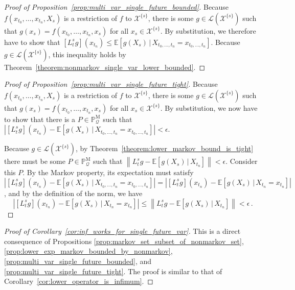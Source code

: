 \documentclass[10pt]{paper}
\theoremstyle{definition}
\newcommand{\states}{\mathcal{X}}
\newcommand{\processes}{\mathbb{P}}
\newcommand{\mprocesses}{\processes^{\mathrm{M}}}
\newcommand{\gambles}{\mathcal{L}}
\newcommand{\rateset}{\mathcal{Q}}
\newcommand{\norm}[1]{\left\lVert #1 \right\rVert}
\newcommand{\abs}[1]{\left\vert #1 \right\vert}
\begin{document}
\begin{proof}[Proof of Proposition~\ref{prop:multi_var_single_future_bounded}]
Because $f(x_{t_0},\ldots,x_{t_n},X_s)$ is a restriction of $f$ to $\states^{\{s\}}$, there is some $g\in\gambles(\states^{\{s\}})$ such that $g(x_s) = f(x_{t_0},\ldots,x_{t_n},x_s)$ for all $x_s\in\states^{\{s\}}$. By substitution, we therefore have to show that $\left[L_t^sg\right](x_{t_n}) \leq \mathbb{E}\left[g(X_s)\,\vert\,X_{t_0,\ldots,t_n}=x_{t_0,\ldots,t_n}\right]$. Because $g\in\gambles(\states^{\{s\}})$, this inequality holds by Theorem~\ref{theorem:nonmarkov_single_var_lower_bounded}.
\end{proof}

\begin{proof}[Proof of Proposition~\ref{prop:multi_var_single_future_tight}]
Because $f(x_{t_0},\ldots,x_{t_n},X_s)$ is a restriction of $f$ to $\states^{\{s\}}$, there is some $g\in\gambles(\states^{\{s\}})$ such that $g(x_s) = f(x_{t_0},\ldots,x_{t_n},x_s)$ for all $x_s\in\states^{\{s\}}$. By substitution, we now have to show that there is a $P\in\mprocesses_\rateset$ such that $\abs{\left[L_t^sg\right](x_{t_n})-\mathbb{E}[g(X_s)\,\vert\,X_{t_0,\ldots,t_n}=x_{t_0,\ldots,t_n}]} < \epsilon$. 

Because $g\in\gambles(\states^{\{s\}})$, by Theorem~\ref{theorem:lower_markov_bound_is_tight} there must be some $P\in\mprocesses_\rateset$ such that $\norm{L_t^sg - \mathbb{E}[g(X_s)\,\vert\,X_{t_n}]} < \epsilon$. Consider this $P$. By the Markov property, its expectation must satisfy $\abs{\left[L_t^sg\right](x_{t_n})-\mathbb{E}[g(X_s)\,\vert\,X_{t_0,\ldots,t_n}=x_{t_0,\ldots,t_n}]} = \abs{\left[L_t^sg\right](x_{t_n})-\mathbb{E}[g(X_s)\,\vert\,X_{t_n}=x_{t_n}]}$, and by the definition of the norm, we have 
\begin{equation*}
\abs{\left[L_t^sg\right](x_{t_n})-\mathbb{E}[g(X_s)\,\vert\,X_{t_n}=x_{t_n}]} \leq \norm{L_t^sg-\mathbb{E}[g(X_s)\,\vert\,X_{t_n}]} < \epsilon\,.
\end{equation*}
\end{proof}

\begin{proof}[Proof of Corollary~\ref{cor:inf_works_for_single_future_var}]
This is a direct consequence of Propositions \ref{prop:markov_set_subset_of_nonmarkov_set}, \ref{prop:lower_exp_markov_bounded_by_nonmarkov}, \ref{prop:multi_var_single_future_bounded}, and \ref{prop:multi_var_single_future_tight}. The proof is similar to that of Corollary~\ref{cor:lower_operator_is_infimum}.
\end{proof}
\end{document}
